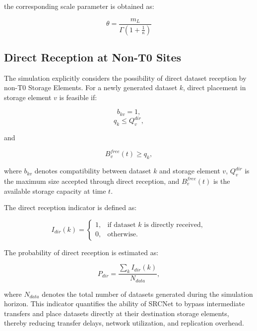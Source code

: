 \documentclass[a4paper,fleqn]{cas-dc}
\begin{document}
the corresponding scale parameter is obtained as: 

\begin{equation} 
\theta = \frac{m_L} {\Gamma \left( 1+\frac{1}{\kappa} \right) }
\end{equation}



\subsection*{Direct Reception at Non-T0 Sites}

The simulation explicitly considers the possibility of direct dataset reception by non-T0 Storage Elements. For a newly generated dataset \(k\), direct placement in storage element \(v\) is feasible if: 

\begin{equation} 
b_{kv}=1, \end{equation} \begin{equation} q_k \le Q_v^{dir}, 
\end{equation} 

and 

\begin{equation} 
B_v^{free}(t)\ge q_k, 
\end{equation} 

where \(b_{kv}\) denotes compatibility between dataset \(k\) and storage element \(v\), \(Q_v^{dir}\) is the maximum size accepted through direct reception, and \(B_v^{free}(t)\) is the available storage capacity at time \(t\). 

The direct reception indicator is defined as: 

\begin{equation} I_{dir}(k) = \begin{cases} 1, & \text{if dataset }k\text{ is directly received},\\ 0, & \text{otherwise}. \end{cases} \end{equation} 

The probability of direct reception is estimated as: 

\begin{equation} 
P_{dir} = \frac{\sum_k I_{dir}(k)} {N_{data}}, 
\end{equation} 

where \(N_{data}\) denotes the total number of datasets generated during the simulation horizon. This indicator quantifies the ability of SRCNet to bypass intermediate transfers and place datasets directly at their destination storage elements, thereby reducing transfer delays, network utilization, and replication overhead.
\end{document}
